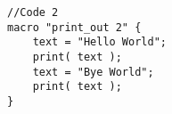 \begin{lstlisting}
//Code 2
macro "print_out 2" {
	text = "Hello World";
	print( text );
	text = "Bye World";
	print( text );
}





\end{lstlisting}